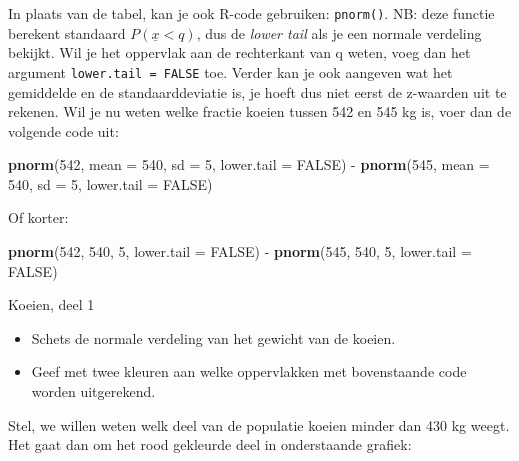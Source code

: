 \documentclass[]{book}
\newenvironment{Shaded}{\begin{snugshade}}{\end{snugshade}}
\newcommand{\KeywordTok}[1]{\textcolor[rgb]{0.13,0.29,0.53}{\textbf{{#1}}}}
\newcommand{\DataTypeTok}[1]{\textcolor[rgb]{0.13,0.29,0.53}{{#1}}}
\newcommand{\DecValTok}[1]{\textcolor[rgb]{0.00,0.00,0.81}{{#1}}}
\newcommand{\StringTok}[1]{\textcolor[rgb]{0.31,0.60,0.02}{{#1}}}
\newcommand{\OtherTok}[1]{\textcolor[rgb]{0.56,0.35,0.01}{{#1}}}
\newcommand{\NormalTok}[1]{{#1}}
\providecommand{\tightlist}{%
  \setlength{\itemsep}{0pt}\setlength{\parskip}{0pt}}
\theoremstyle{definition}
\theoremstyle{definition}
\theoremstyle{definition}
\theoremstyle{remark}
\let\BeginKnitrBlock\begin \let\EndKnitrBlock\end
\begin{document}
In plaats van de tabel, kan je ook R-code gebruiken: \texttt{pnorm()}.
NB: deze functie berekent standaard
\(P \left( \underline{x}<q \right)\), dus de \emph{lower tail} als je
een normale verdeling bekijkt. Wil je het oppervlak aan de rechterkant
van q weten, voeg dan het argument \texttt{lower.tail\ =\ FALSE} toe.
Verder kan je ook aangeven wat het gemiddelde en de standaarddeviatie
is, je hoeft dus niet eerst de z-waarden uit te rekenen. Wil je nu weten
welke fractie koeien tussen 542 en 545 kg is, voer dan de volgende code
uit:

\begin{Shaded}
\begin{Highlighting}[]
\KeywordTok{pnorm}\NormalTok{(}\DecValTok{542}\NormalTok{, }\DataTypeTok{mean =} \DecValTok{540}\NormalTok{, }\DataTypeTok{sd =} \DecValTok{5}\NormalTok{, }\DataTypeTok{lower.tail =} \OtherTok{FALSE}\NormalTok{) -}\StringTok{ }
\StringTok{  }\KeywordTok{pnorm}\NormalTok{(}\DecValTok{545}\NormalTok{, }\DataTypeTok{mean =} \DecValTok{540}\NormalTok{, }\DataTypeTok{sd =} \DecValTok{5}\NormalTok{, }\DataTypeTok{lower.tail =} \OtherTok{FALSE}\NormalTok{)}
\end{Highlighting}
\end{Shaded}

Of korter:

\begin{Shaded}
\begin{Highlighting}[]
\KeywordTok{pnorm}\NormalTok{(}\DecValTok{542}\NormalTok{, }\DecValTok{540}\NormalTok{, }\DecValTok{5}\NormalTok{, }\DataTypeTok{lower.tail =} \OtherTok{FALSE}\NormalTok{) -}
\StringTok{  }\KeywordTok{pnorm}\NormalTok{(}\DecValTok{545}\NormalTok{, }\DecValTok{540}\NormalTok{, }\DecValTok{5}\NormalTok{, }\DataTypeTok{lower.tail =} \OtherTok{FALSE}\NormalTok{)}
\end{Highlighting}
\end{Shaded}

\BeginKnitrBlock{exercise}
\protect\hypertarget{exr:koe1}{}{\label{exr:koe1} }Koeien, deel 1

\begin{itemize}
\tightlist
\item
  Schets de normale verdeling van het gewicht van de koeien.
\item
  Geef met twee kleuren aan welke oppervlakken met bovenstaande code
  worden uitgerekend.
\end{itemize}
\EndKnitrBlock{exercise}

Stel, we willen weten welk deel van de populatie koeien minder dan 430
kg weegt. Het gaat dan om het rood gekleurde deel in onderstaande
grafiek:
\end{document}

